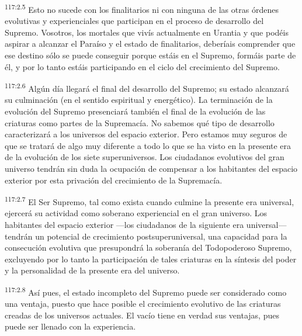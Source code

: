 \par
\textsuperscript{117:2.5} Esto no sucede con los finalitarios ni con ninguna de las otras órdenes evolutivas y experienciales que participan en el proceso de desarrollo del Supremo. Vosotros, los mortales que vivís actualmente en Urantia y que podéis aspirar a alcanzar el Paraíso y el estado de finalitarios, deberíais comprender que ese destino sólo se puede conseguir porque estáis en el Supremo, formáis parte de él, y por lo tanto estáis participando en el ciclo del crecimiento del Supremo.

\par
\textsuperscript{117:2.6} Algún día llegará el final del desarrollo del Supremo; su estado alcanzará su culminación (en el sentido espiritual y energético). La terminación de la evolución del Supremo presenciará también el final de la evolución de las criaturas como partes de la Supremacía. No sabemos qué tipo de desarrollo caracterizará a los universos del espacio exterior. Pero estamos muy seguros de que se tratará de algo muy diferente a todo lo que se ha visto en la presente era de la evolución de los siete superuniversos. Los ciudadanos evolutivos del gran universo tendrán sin duda la ocupación de compensar a los habitantes del espacio exterior por esta privación del crecimiento de la Supremacía.

\par
\textsuperscript{117:2.7} El Ser Supremo, tal como exista cuando culmine la presente era universal, ejercerá su actividad como soberano experiencial en el gran universo. Los habitantes del espacio exterior ---los ciudadanos de la siguiente era universal--- tendrán un potencial de crecimiento postsuperuniversal, una capacidad para la consecución evolutiva que presupondrá la soberanía del Todopoderoso Supremo, excluyendo por lo tanto la participación de tales criaturas en la síntesis del poder y la personalidad de la presente era del universo.

\par
\textsuperscript{117:2.8} Así pues, el estado incompleto del Supremo puede ser considerado como una ventaja, puesto que hace posible el crecimiento evolutivo de las criaturas creadas de los universos actuales. El vacío tiene en verdad sus ventajas, pues puede ser llenado con la experiencia.

